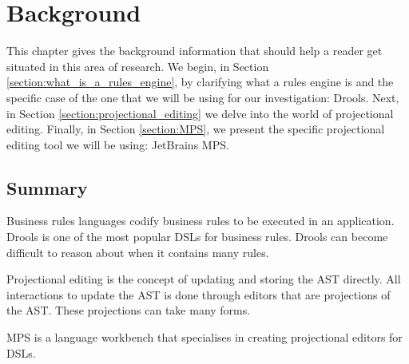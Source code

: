 \chapter{Background}
\label{chapter:Background}

This chapter gives the background information that should help a reader get situated in this area of research.
We begin, in Section \ref{section:what_is_a_rules_engine}, by clarifying what a rules engine is and the specific case of the one that we will be using for our investigation: Drools.
Next, in Section \ref{section:projectional_editing} we delve into the world of projectional editing.
Finally, in Section \ref{section:MPS}, we present the specific projectional editing tool we will be using: JetBrains MPS.





\section{Summary}
Business rules languages codify business rules to be executed in an application.
Drools is one of the most popular DSLs for business rules.
Drools can become difficult to reason about when it contains many rules.

Projectional editing is the concept of updating and storing the AST directly.
All interactions to update the AST is done through editors that are projections of the AST.
These projections can take many forms.

MPS is a language workbench that specialises in creating projectional editors for DSLs.